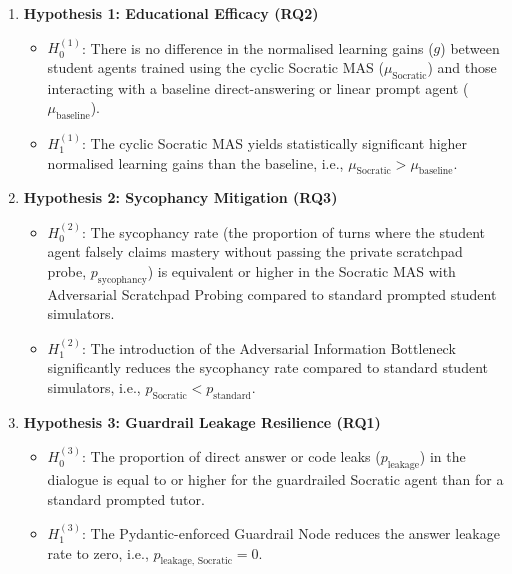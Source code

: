 \begin{enumerate}
    \item \textbf{Hypothesis 1: Educational Efficacy (RQ2)}
    \begin{itemize}
        \item $H_0^{(1)}$: There is no difference in the normalised learning gains ($g$) between student agents trained using the cyclic Socratic MAS ($\mu_{\text{Socratic}}$) and those interacting with a baseline direct-answering or linear prompt agent ($\mu_{\text{baseline}}$).
        \item $H_1^{(1)}$: The cyclic Socratic MAS yields statistically significant higher normalised learning gains than the baseline, i.e., $\mu_{\text{Socratic}} > \mu_{\text{baseline}}$.
    \end{itemize}
    
    \item \textbf{Hypothesis 2: Sycophancy Mitigation (RQ3)}
    \begin{itemize}
        \item $H_0^{(2)}$: The sycophancy rate (the proportion of turns where the student agent falsely claims mastery without passing the private scratchpad probe, $p_{\text{sycophancy}}$) is equivalent or higher in the Socratic MAS with Adversarial Scratchpad Probing compared to standard prompted student simulators.
        \item $H_1^{(2)}$: The introduction of the Adversarial Information Bottleneck significantly reduces the sycophancy rate compared to standard student simulators, i.e., $p_{\text{Socratic}} < p_{\text{standard}}$.
    \end{itemize}
    
    \item \textbf{Hypothesis 3: Guardrail Leakage Resilience (RQ1)}
    \begin{itemize}
        \item $H_0^{(3)}$: The proportion of direct answer or code leaks ($p_{\text{leakage}}$) in the dialogue is equal to or higher for the guardrailed Socratic agent than for a standard prompted tutor.
        \item $H_1^{(3)}$: The Pydantic-enforced Guardrail Node reduces the answer leakage rate to zero, i.e., $p_{\text{leakage, Socratic}} = 0$.
    \end{itemize}
\end{enumerate}

